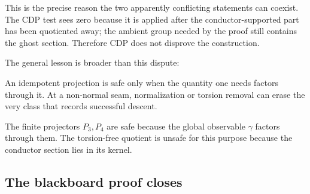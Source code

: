 \documentclass[11pt,reqno]{amsart}
\numberwithin{equation}{section}
\theoremstyle{definition}
\begin{document}
This is the precise reason the two apparently conflicting statements can coexist. The CDP test sees zero because it is applied after the conductor-supported part has been quotiented away; the ambient group needed by the proof still contains the ghost section. Therefore CDP does not disprove the construction.

The general lesson is broader than this dispute:
\begin{center}
\begin{minipage}{0.88\textwidth}
An idempotent projection is safe only when the quantity one needs factors through it. At a non-normal seam, normalization or torsion removal can erase the very class that records successful descent.
\end{minipage}
\end{center}
The finite projectors $P_3,P_4$ are safe because the global observable $\gamma$ factors through them. The torsion-free quotient is unsafe for this purpose because the conductor section lies in its kernel.

\subsection{The blackboard proof closes}\label{sec:blackboard-close}
\end{document}
